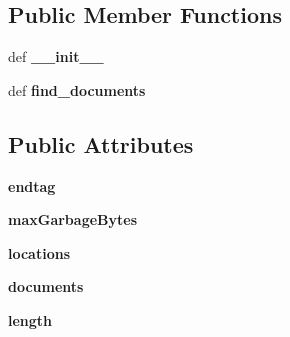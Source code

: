 \subsection*{Public Member Functions}
\begin{DoxyCompactItemize}
\item 
\hypertarget{classcheshire3_1_1document_factory_1_1_xml_document_stream_a6baf035f0926c48f7fcf5105878126e3}{def {\bfseries \-\_\-\-\_\-init\-\_\-\-\_\-}}\label{classcheshire3_1_1document_factory_1_1_xml_document_stream_a6baf035f0926c48f7fcf5105878126e3}

\item 
\hypertarget{classcheshire3_1_1document_factory_1_1_xml_document_stream_a10f9905af9b5bf1572be8cdc5594097b}{def {\bfseries find\-\_\-documents}}\label{classcheshire3_1_1document_factory_1_1_xml_document_stream_a10f9905af9b5bf1572be8cdc5594097b}

\end{DoxyCompactItemize}
\subsection*{Public Attributes}
\begin{DoxyCompactItemize}
\item 
\hypertarget{classcheshire3_1_1document_factory_1_1_xml_document_stream_ae817dcbf8ecc316fa7fb88375168c9df}{{\bfseries endtag}}\label{classcheshire3_1_1document_factory_1_1_xml_document_stream_ae817dcbf8ecc316fa7fb88375168c9df}

\item 
\hypertarget{classcheshire3_1_1document_factory_1_1_xml_document_stream_a607f9a4dc3f4e757a9da1e4baac8d1a8}{{\bfseries max\-Garbage\-Bytes}}\label{classcheshire3_1_1document_factory_1_1_xml_document_stream_a607f9a4dc3f4e757a9da1e4baac8d1a8}

\item 
\hypertarget{classcheshire3_1_1document_factory_1_1_xml_document_stream_a6120976427437dc7b1d5d9898d8cc379}{{\bfseries locations}}\label{classcheshire3_1_1document_factory_1_1_xml_document_stream_a6120976427437dc7b1d5d9898d8cc379}

\item 
\hypertarget{classcheshire3_1_1document_factory_1_1_xml_document_stream_adb1a6f20b1e9cf25b57fc79d16a9988d}{{\bfseries documents}}\label{classcheshire3_1_1document_factory_1_1_xml_document_stream_adb1a6f20b1e9cf25b57fc79d16a9988d}

\item 
\hypertarget{classcheshire3_1_1document_factory_1_1_xml_document_stream_a610229317dc5de6c949f7fc0a5a01d57}{{\bfseries length}}\label{classcheshire3_1_1document_factory_1_1_xml_document_stream_a610229317dc5de6c949f7fc0a5a01d57}

\end{DoxyCompactItemize}
